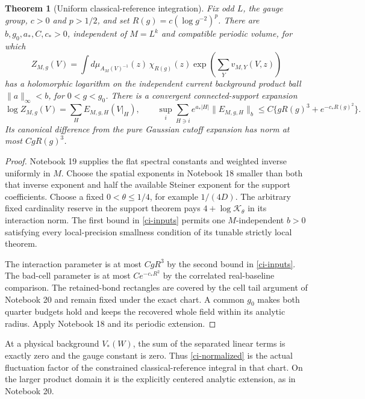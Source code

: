 \documentclass[11pt]{article}
\newtheorem{theorem}{Theorem}[section]
\theoremstyle{remark}
\begin{document}
\begin{theorem}[Uniform classical-reference integration]
\label{ci-theorem}
Fix odd $L$, the gauge group, $c>0$ and $p>1/2$, and set
$R(g)=c(\log g^{-2})^p$. There are
$b,g_0,a_*,C,c_*>0$, independent of $M=L^k$ and compatible
periodic volume, for which
\begin{equation}\label{ci-normalized}
 Z_{M,g}(V)=\int d\mu_{A_M(V)^{-1}}(z)\,
       \chi_{R(g)}(z)\exp\left(\sum_Yv_{M,Y}(V,z)\right)
\end{equation}
has a holomorphic logarithm on the independent current
background product ball $\|a\|_\infty<b$, for $0<g<g_0$.
There is a convergent connected-support expansion
\begin{equation}\label{ci-result}
 \log Z_{M,g}(V)=\sum_HE_{M,g,H}(V|_H),\qquad
 \sup_i\sum_{H\ni i}e^{a_*|H|}\|E_{M,g,H}\|_b
       \le C\{gR(g)^3+e^{-c_*R(g)^2}\}.
\end{equation}
Its canonical difference from the pure Gaussian cutoff
expansion has norm at most $CgR(g)^3$.
\end{theorem}
\begin{proof}
Notebook 19 supplies the flat spectral constants and weighted
inverse uniformly in $M$. Choose the spatial exponents in
Notebook 18 smaller than both that inverse exponent and half
the available Steiner exponent for the support coefficients.
Choose a fixed $0<\theta\le1/4$, for example $1/(4D)$.
The arbitrary fixed cardinality reserve in the support
theorem pays $4+\log\mathcal K_\theta$ in its interaction norm.
The first bound in \eqref{ci-inputs} permits one
$M$-independent $b>0$ satisfying every local-precision
smallness condition of its tunable strictly local theorem.

The interaction parameter is at most $CgR^3$ by the second
bound in \eqref{ci-inputs}. The bad-cell parameter is at most
$Ce^{-c_*R^2}$ by the correlated real-baseline comparison.
The retained-bond rectangles are covered by the cell tail
argument of Notebook 20 and remain fixed under the exact
chart. A common $g_0$ makes both quarter budgets hold and
keeps the recovered whole field within its analytic radius.
Apply Notebook 18 and its periodic extension.
\end{proof}

At a physical background $V_*(W)$, the sum of the separated
linear terms is exactly zero and the gauge constant is zero.
Thus \eqref{ci-normalized} is the actual fluctuation factor
of the constrained classical-reference integral in that
chart. On the larger product domain it is the explicitly
centered analytic extension, as in Notebook 20.
\end{document}
